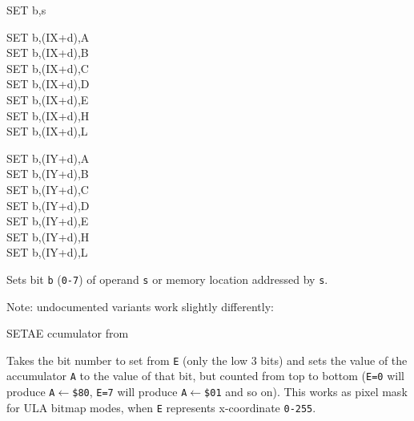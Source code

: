 \begin{basedescript}{
	\desclabelstyle{\multilinelabel}
	\desclabelwidth{3cm}}
\begin{DetailItem}{SET b,s}
\begin{DetailVariants}
			\columnbreak
			SET b,(IX+d),A\UNDOC\\
			SET b,(IX+d),B\UNDOC\\
			SET b,(IX+d),C\UNDOC\\
			SET b,(IX+d),D\UNDOC\\
			SET b,(IX+d),E\UNDOC\\
			SET b,(IX+d),H\UNDOC\\
			SET b,(IX+d),L\UNDOC

			\columnbreak
			SET b,(IY+d),A\UNDOC\\
			SET b,(IY+d),B\UNDOC\\
			SET b,(IY+d),C\UNDOC\\
			SET b,(IY+d),D\UNDOC\\
			SET b,(IY+d),E\UNDOC\\
			SET b,(IY+d),H\UNDOC\\
			SET b,(IY+d),L\UNDOC
		\end{DetailVariants}

		Sets bit {\tt b} ({\tt 0-7}) of operand {\tt s} or memory location addressed by {\tt s}.

		Note: undocumented variants work slightly differently:

		\begin{multicols}{2}

		\end{multicols}

		\begin{DetailEffects}
			\FlagsSETr
		\end{DetailEffects}			

		\begin{DetailTiming}
		\end{DetailTiming}

	\end{DetailItem}

	\begin{DetailItem}{SETAE\ZXN}
		{ ccumulator from }
		{\SymSETAE}

		Takes the bit number to set from {\tt E} (only the low 3 bits) and sets the value of the accumulator {\tt A} to the value of that bit, but counted from top to bottom ({\tt E=0} will produce {\tt A$\leftarrow$\$80}, {\tt E=7} will produce {\tt A$\leftarrow$\$01} and so on). This works as pixel mask for ULA bitmap modes, when {\tt E} represents x-coordinate {\tt 0-255}.


\end{DetailItem}
\end{basedescript}
